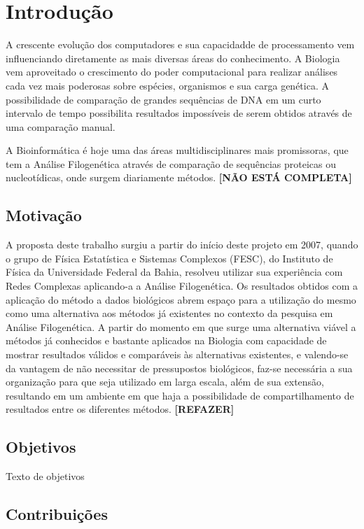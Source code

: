 \chapter{Introdução}

A crescente evolução dos computadores e sua capacidadde de processamento vem influenciando diretamente as mais diversas áreas do conhecimento. A Biologia
vem aproveitado o crescimento do poder computacional para realizar análises cada vez mais poderosas sobre espécies, organismos e sua carga genética.
A possibilidade de comparação de grandes sequências de DNA em um curto intervalo de tempo possibilita resultados impossíveis de serem obtidos através
de uma comparação manual.

A Bioinformática é hoje uma das áreas multidisciplinares mais promissoras, que tem a Análise Filogenética através de comparação de sequências proteicas ou
nucleotídicas, onde surgem diariamente métodos. \textbf{[NÃO ESTÁ COMPLETA]}

\section{Motivação}

A proposta deste trabalho surgiu a partir do início deste projeto em 2007, quando o grupo de Física Estatística e Sistemas Complexos (FESC),
do Instituto de Física da Universidade Federal da Bahia, resolveu utilizar sua experiência com Redes Complexas aplicando-a a Análise Filogenética.
Os resultados obtidos com a aplicação do método a dados biológicos abrem espaço para a utilização do mesmo como uma alternativa aos métodos
já existentes no contexto da pesquisa em Análise Filogenética. A partir do momento em que surge uma alternativa viável a métodos já conhecidos
e bastante aplicados na Biologia com capacidade de mostrar resultados válidos e comparáveis às alternativas existentes, e valendo-se da vantagem
de não necessitar de pressupostos biológicos, faz-se necessária a sua organização para que seja utilizado em larga escala, além de sua extensão,
resultando em um ambiente em que haja a possibilidade de compartilhamento de resultados entre os diferentes métodos. \textbf{[REFAZER]}

\section{Objetivos} \label{sec:objetivos}

Texto de objetivos

\section{Contribuições}

